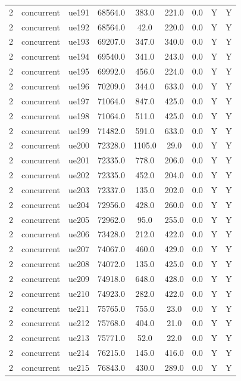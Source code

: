 \begin{table}[ht]
\begin{tabular}{|c|c|c|c|c|c|c|c|c|}
2 & concurrent & ue191 & 68564.0 & 383.0 & 221.0 & 0.0 & Y & Y \\
2 & concurrent & ue192 & 68564.0 & 42.0 & 220.0 & 0.0 & Y & Y \\
2 & concurrent & ue193 & 69207.0 & 347.0 & 340.0 & 0.0 & Y & Y \\
2 & concurrent & ue194 & 69540.0 & 341.0 & 243.0 & 0.0 & Y & Y \\
2 & concurrent & ue195 & 69992.0 & 456.0 & 224.0 & 0.0 & Y & Y \\
2 & concurrent & ue196 & 70209.0 & 344.0 & 633.0 & 0.0 & Y & Y \\
2 & concurrent & ue197 & 71064.0 & 847.0 & 425.0 & 0.0 & Y & Y \\
2 & concurrent & ue198 & 71064.0 & 511.0 & 425.0 & 0.0 & Y & Y \\
2 & concurrent & ue199 & 71482.0 & 591.0 & 633.0 & 0.0 & Y & Y \\
2 & concurrent & ue200 & 72328.0 & 1105.0 & 29.0 & 0.0 & Y & Y \\
2 & concurrent & ue201 & 72335.0 & 778.0 & 206.0 & 0.0 & Y & Y \\
2 & concurrent & ue202 & 72335.0 & 452.0 & 204.0 & 0.0 & Y & Y \\
2 & concurrent & ue203 & 72337.0 & 135.0 & 202.0 & 0.0 & Y & Y \\
2 & concurrent & ue204 & 72956.0 & 428.0 & 260.0 & 0.0 & Y & Y \\
2 & concurrent & ue205 & 72962.0 & 95.0 & 255.0 & 0.0 & Y & Y \\
2 & concurrent & ue206 & 73428.0 & 212.0 & 422.0 & 0.0 & Y & Y \\
2 & concurrent & ue207 & 74067.0 & 460.0 & 429.0 & 0.0 & Y & Y \\
2 & concurrent & ue208 & 74072.0 & 135.0 & 425.0 & 0.0 & Y & Y \\
2 & concurrent & ue209 & 74918.0 & 648.0 & 428.0 & 0.0 & Y & Y \\
2 & concurrent & ue210 & 74923.0 & 282.0 & 422.0 & 0.0 & Y & Y \\
2 & concurrent & ue211 & 75765.0 & 755.0 & 23.0 & 0.0 & Y & Y \\
2 & concurrent & ue212 & 75768.0 & 404.0 & 21.0 & 0.0 & Y & Y \\
2 & concurrent & ue213 & 75771.0 & 52.0 & 22.0 & 0.0 & Y & Y \\
2 & concurrent & ue214 & 76215.0 & 145.0 & 416.0 & 0.0 & Y & Y \\
2 & concurrent & ue215 & 76843.0 & 430.0 & 289.0 & 0.0 & Y & Y \\

\end{tabular}
\end{table}
